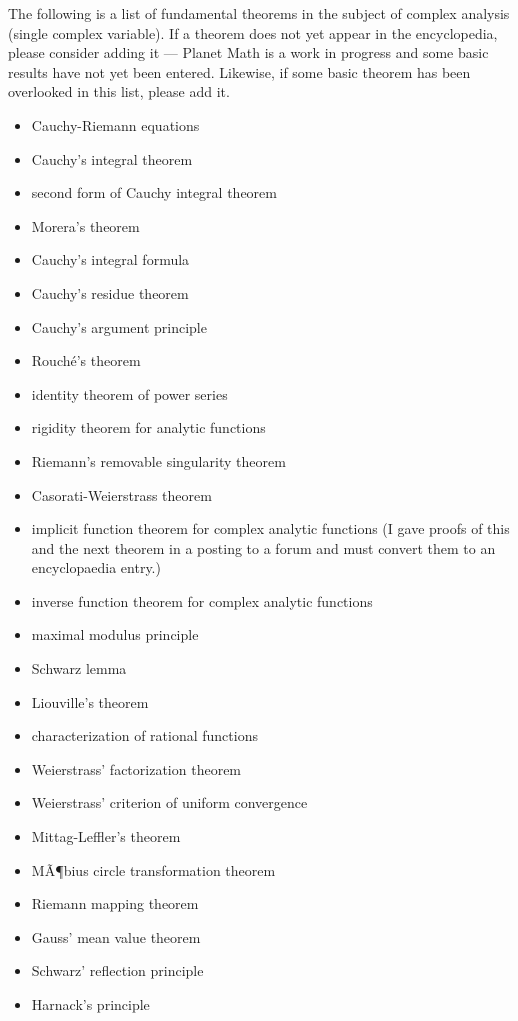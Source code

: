 \documentclass[12pt]{article}
\begin{document}
The following is a list of fundamental theorems in the subject of complex analysis (single complex variable).  If a theorem does not yet appear in the encyclopedia, please consider adding it --- Planet Math is a work in progress and  some basic results have not yet been entered.  Likewise, if some basic theorem has been overlooked in this list, please add it.

\begin{itemize}
\item Cauchy-Riemann equations
\item Cauchy's integral theorem
\item second form of Cauchy integral theorem
\item Morera's theorem
\item Cauchy's integral formula
\item Cauchy's residue theorem
\item Cauchy's argument principle
\item Rouch\'e's theorem
\item identity theorem of power series
\item rigidity theorem for analytic functions
\item Riemann's removable singularity theorem 
\item Casorati-Weierstrass theorem
\item implicit function theorem for complex analytic functions (I gave proofs of this and the next theorem in a posting to a forum and must convert them to an encyclopaedia entry.)
\item inverse function theorem for complex analytic functions
\item maximal modulus principle
\item Schwarz lemma
\item Liouville's theorem
\item characterization of rational functions
\item Weierstrass' factorization theorem
\item Weierstrass' criterion of uniform convergence
\item Mittag-Leffler's theorem 
\item MÃ¶bius circle transformation theorem 
\item Riemann mapping theorem
\item Gauss' mean value theorem
\item Schwarz' reflection principle
\item Harnack's principle

\end{itemize}
\end{document}
